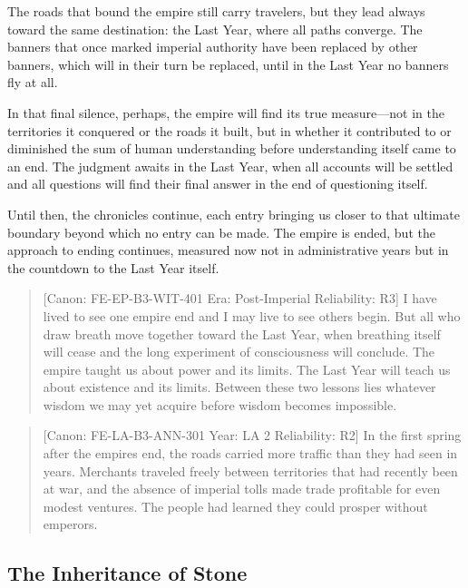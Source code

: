 The roads that bound the empire still carry travelers, but they lead
always toward the same destination: the Last Year, where all paths
converge. The banners that once marked imperial authority have been
replaced by other banners, which will in their turn be replaced, until
in the Last Year no banners fly at all.

In that final silence, perhaps, the empire will find its true
measure---not in the territories it conquered or the roads it built, but
in whether it contributed to or diminished the sum of human
understanding before understanding itself came to an end. The judgment
awaits in the Last Year, when all accounts will be settled and all
questions will find their final answer in the end of questioning itself.

Until then, the chronicles continue, each entry bringing us closer to
that ultimate boundary beyond which no entry can be made. The empire is
ended, but the approach to ending continues, measured now not in
administrative years but in the countdown to the Last Year itself.

\begin{quote}
{[}Canon: FE-EP-B3-WIT-401 \textbar{} Era: Post-Imperial \textbar{}
Reliability: R3{]} I have lived to see one empire end and I may live to
see others begin. But all who draw breath move together toward the Last
Year, when breathing itself will cease and the long experiment of
consciousness will conclude. The empire taught us about power and its
limits. The Last Year will teach us about existence and its limits.
Between these two lessons lies whatever wisdom we may yet acquire before
wisdom becomes impossible.
\end{quote}

\begin{quote}
{[}Canon: FE-LA-B3-ANN-301 \textbar{} Year: LA 2 \textbar{} Reliability:
R2{]} In the first spring after the empire\textquotesingle s end, the
roads carried more traffic than they had seen in years. Merchants
traveled freely between territories that had recently been at war, and
the absence of imperial tolls made trade profitable for even modest
ventures. The people had learned they could prosper without emperors.
\end{quote}

\subsection{The Inheritance of Stone}\label{the-inheritance-of-stone}


